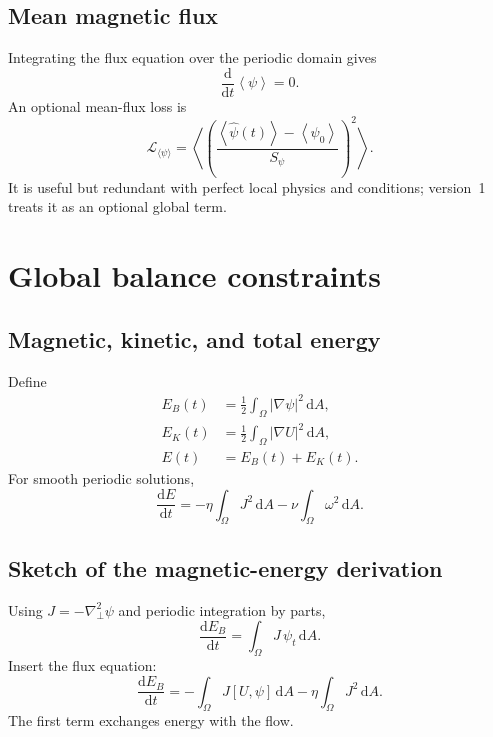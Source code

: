 \documentclass[11pt]{article}
\newcommand{\dd}{\mathrm{d}}
\newcommand{\average}[1]{\left\langle #1\right\rangle}
\newcommand{\Lap}{\nabla_\perp^2}
\begin{document}
\subsection{Mean magnetic flux}
Integrating the flux equation over the periodic domain gives
\begin{equation}
\frac{\dd}{\dd t}\average\psi=0.
\end{equation}
An optional mean-flux loss is
\begin{equation}
\mathcal{L}_{\langle\psi\rangle}
=\average{
\left(
\frac{\average{\widehat\psi(t)}-\average{\psi_0}}{S_\psi}
\right)^2
}.
\end{equation}
It is useful but redundant with perfect local physics and conditions; version~1 treats it as an optional global term.

\section{Global balance constraints}
\label{sec:global}

\subsection{Magnetic, kinetic, and total energy}
Define
\begin{align}
E_B(t)&=\frac12\int_\Omega |\nabla\psi|^2\,\dd A,\\
E_K(t)&=\frac12\int_\Omega |\nabla U|^2\,\dd A,\\
E(t)&=E_B(t)+E_K(t).
\end{align}
For smooth periodic solutions,
\begin{equation}
\boxed{
\frac{\dd E}{\dd t}
=-\eta\int_\Omega J^2\,\dd A
-\nu\int_\Omega \omega^2\,\dd A.
}
\label{eq:energy_balance}
\end{equation}

\subsection{Sketch of the magnetic-energy derivation}
Using $J=-\Lap\psi$ and periodic integration by parts,
\begin{equation}
\frac{\dd E_B}{\dd t}
=\int_\Omega J\,\psi_t\,\dd A.
\end{equation}
Insert the flux equation:
\begin{equation}
\frac{\dd E_B}{\dd t}
=-\int_\Omega J[U,\psi] \,\dd A
-\eta\int_\Omega J^2\,\dd A.
\end{equation}
The first term exchanges energy with the flow.
\end{document}
